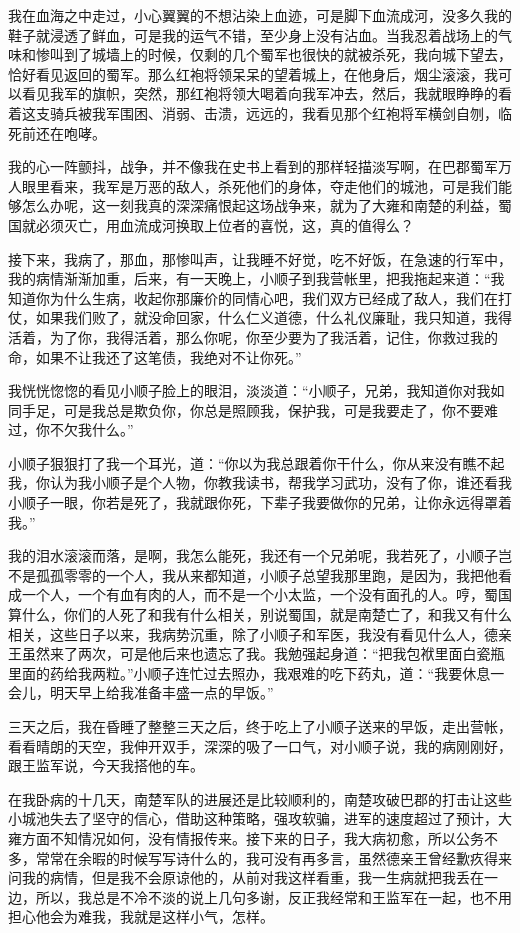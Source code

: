 我在血海之中走过，小心翼翼的不想沾染上血迹，可是脚下血流成河，没多久我的鞋子就浸透了鲜血，可是我的运气不错，至少身上没有沾血。当我忍着战场上的气味和惨叫到了城墙上的时候，仅剩的几个蜀军也很快的就被杀死，我向城下望去，恰好看见返回的蜀军。那么红袍将领呆呆的望着城上，在他身后，烟尘滚滚，我可以看见我军的旗帜，突然，那红袍将领大喝着向我军冲去，然后，我就眼睁睁的看着这支骑兵被我军围困、消弱、击溃，远远的，我看见那个红袍将军横剑自刎，临死前还在咆哮。

我的心一阵颤抖，战争，并不像我在史书上看到的那样轻描淡写啊，在巴郡蜀军万人眼里看来，我军是万恶的敌人，杀死他们的身体，夺走他们的城池，可是我们能够怎么办呢，这一刻我真的深深痛恨起这场战争来，就为了大雍和南楚的利益，蜀国就必须灭亡，用血流成河换取上位者的喜悦，这，真的值得么？

接下来，我病了，那血，那惨叫声，让我睡不好觉，吃不好饭，在急速的行军中，我的病情渐渐加重，后来，有一天晚上，小顺子到我营帐里，把我拖起来道：“我知道你为什么生病，收起你那廉价的同情心吧，我们双方已经成了敌人，我们在打仗，如果我们败了，就没命回家，什么仁义道德，什么礼仪廉耻，我只知道，我得活着，为了你，我得活着，那么你呢，你至少要为了我活着，记住，你救过我的命，如果不让我还了这笔债，我绝对不让你死。”

我恍恍惚惚的看见小顺子脸上的眼泪，淡淡道：“小顺子，兄弟，我知道你对我如同手足，可是我总是欺负你，你总是照顾我，保护我，可是我要走了，你不要难过，你不欠我什么。”

小顺子狠狠打了我一个耳光，道：“你以为我总跟着你干什么，你从来没有瞧不起我，你认为我小顺子是个人物，你教我读书，帮我学习武功，没有了你，谁还看我小顺子一眼，你若是死了，我就跟你死，下辈子我要做你的兄弟，让你永远得罩着我。”

我的泪水滚滚而落，是啊，我怎么能死，我还有一个兄弟呢，我若死了，小顺子岂不是孤孤零零的一个人，我从来都知道，小顺子总望我那里跑，是因为，我把他看成一个人，一个有血有肉的人，而不是一个小太监，一个没有面孔的人。哼，蜀国算什么，你们的人死了和我有什么相关，别说蜀国，就是南楚亡了，和我又有什么相关，这些日子以来，我病势沉重，除了小顺子和军医，我没有看见什么人，德亲王虽然来了两次，可是他后来也遗忘了我。我勉强起身道：“把我包袱里面白瓷瓶里面的药给我两粒。”小顺子连忙过去照办，我艰难的吃下药丸，道：“我要休息一会儿，明天早上给我准备丰盛一点的早饭。”

三天之后，我在昏睡了整整三天之后，终于吃上了小顺子送来的早饭，走出营帐，看看晴朗的天空，我伸开双手，深深的吸了一口气，对小顺子说，我的病刚刚好，跟王监军说，今天我搭他的车。

在我卧病的十几天，南楚军队的进展还是比较顺利的，南楚攻破巴郡的打击让这些小城池失去了坚守的信心，借助这种策略，强攻软骗，进军的速度超过了预计，大雍方面不知情况如何，没有情报传来。接下来的日子，我大病初愈，所以公务不多，常常在余暇的时候写写诗什么的，我可没有再多言，虽然德亲王曾经歉疚得来问我的病情，但是我不会原谅他的，从前对我这样看重，我一生病就把我丢在一边，所以，我总是不冷不淡的说上几句多谢，反正我经常和王监军在一起，也不用担心他会为难我，我就是这样小气，怎样。

